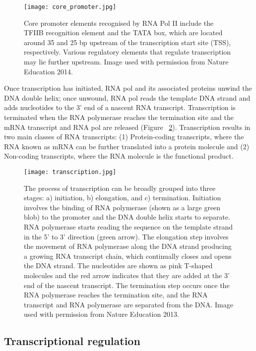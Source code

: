 \begin{figure}[!ht]
   \centering
   \texttt{[image: core\_promoter.jpg]}
   \caption[Core promoter elements]{Core promoter elements recognised by RNA Pol II include the TFIIB recognition element and the TATA box, which are located around 35 and 25 bp upstream of the transcription start site (TSS), respectively. Various regulatory elements that regulate transcription may lie further upstream. Image used with permission from Nature Education 2014.}
   \label{fig:core_promoter}
\end{figure}

Once transcription has initiated, RNA pol and its associated proteins unwind the DNA double helix; once unwound, RNA pol reads the template DNA strand and adds nucleotides to the 3' end of a nascent RNA transcript. Transcription is terminated when the RNA polymerase reaches the termination site and the mRNA transcript and RNA pol are released (Figure ~\ref{fig:transcription}). Transcription results in two main classes of RNA transcripts: (1) Protein-coding transcripts, where the RNA known as mRNA can be further translated into a protein molecule and (2) Non-coding transcripts, where the RNA molecule is the functional product.

\begin{figure}[!ht]
   \centering
   \texttt{[image: transcription.jpg]}
   \caption[DNA transcription]{The process of transcription can be broadly grouped into three stages: a) initiation, b) elongation, and c) termination. Initiation involves the binding of RNA polymerase (shown as a large green blob) to the promoter and the DNA double helix starts to separate. RNA polymerase starts reading the sequence on the template strand in the 5' to 3' direction (green arrow). The elongation step involves the movement of RNA polymerase along the DNA strand producing a growing RNA transcript chain, which continually closes and opens the DNA strand. The nucleotides are shown as pink T-shaped molecules and the red arrow indicates that they are added at the 3' end of the nascent transcript. The termination step occurs once the RNA polymerase reaches the termination site, and the RNA transcript and RNA polymerase are separated from the DNA. Image used with permission from Nature Education 2013.}
   \label{fig:transcription}
\end{figure}

\subsection{Transcriptional regulation}

